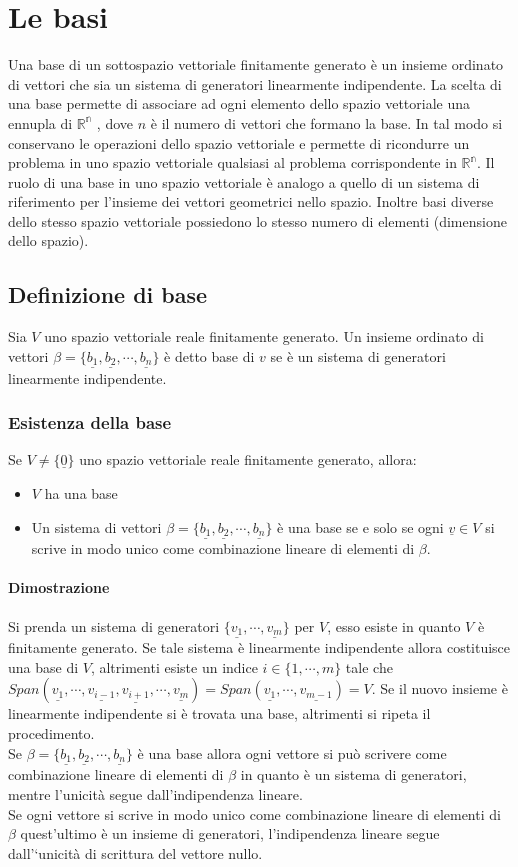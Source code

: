\chapter{Le basi}
Una base di un sottospazio vettoriale finitamente generato \`e un insieme ordinato di vettori che sia un sistema di generatori linearmente indipendente. La scelta di una 
base permette di associare ad ogni elemento dello spazio vettoriale una ennupla di $\mathbb{R^n}$ , dove $n$ è il numero di vettori che formano la base. In tal modo si 
conservano le operazioni dello spazio vettoriale e permette di ricondurre un problema in uno spazio vettoriale qualsiasi al problema corrispondente in $\mathbb{R^n}$. Il ruolo di una base in uno spazio vettoriale \`e analogo a quello di un sistema di riferimento per l'insieme dei vettori
geometrici nello spazio. Inoltre basi diverse dello stesso spazio vettoriale possiedono lo stesso numero di elementi (dimensione dello spazio).
\section{Definizione di base}
Sia $V$ uno spazio vettoriale reale finitamente generato. Un insieme ordinato di vettori $\beta=\{\underline{b_1},\underline{b_2},\cdots, \underline{b_n}\}$ \`e detto base 
di $v$ se \`e un sistema di generatori linearmente indipendente.
\subsection{Esistenza della base}
Se $V\neq \{\underline{0}\}$ uno spazio vettoriale reale finitamente generato, allora:
\begin{itemize}
\item $V$ ha una base
\item Un sistema di vettori $\beta=\{\underline{b_1},\underline{b_2},\cdots, \underline{b_n}\}$ \`e una base se e solo se ogni $\underline{v}\in V$ si scrive in modo unico
come combinazione lineare di elementi di $\beta$.
\end{itemize}
\subsubsection{Dimostrazione}
Si prenda un sistema di generatori $\{\underline{v_1},\cdots,\underline{v_m}\}$ per $V$, esso esiste in quanto $V$ \`e finitamente generato. Se tale sistema \`e linearmente
indipendente allora costituisce una base di $V$, altrimenti esiste un indice $i\in\{1,\cdots,m\}$ tale che $Span(\underline{v_1},\cdots,\underline{v_{i-1}},\underline{v_{i
+1}},\cdots,\underline{v_m})=Span(\underline{v_1},\cdots,\underline{v_{m-1}})=V$. Se il nuovo insieme \`e linearmente indipendente si \`e trovata una base, altrimenti si ripeta
il procedimento.\\
Se $\beta=\{\underline{b_1},\underline{b_2},\cdots, \underline{b_n}\}$ \`e una base allora ogni vettore si pu\`o scrivere come combinazione lineare di elementi di $\beta$ in 
quanto \`e un sistema di generatori, mentre l'unicit\`a segue dall'indipendenza lineare.\\
Se ogni vettore si scrive in modo unico come combinazione lineare di elementi di $\beta$ quest'ultimo \`e un insieme di generatori, l'indipendenza lineare segue 
dall'`unicit\`a di scrittura del vettore nullo.
